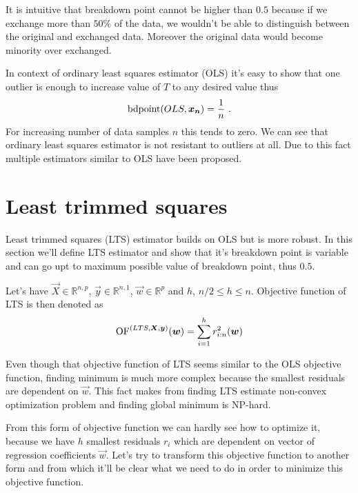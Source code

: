 It is intuitive that breakdown point cannot be higher than $0.5$ \cite{rouss:1986} because if we exchange more than $50\%$ of the data, we wouldn't be able to distinguish between the original and exchanged data. Moreover the original data would become minority over exchanged.


In context of ordinary least squares estimator (OLS) it's easy to show that one outlier is enough to increase value of $T$ to any desired value thus 
\begin{equation}
    \bdpoint(OLS,\vec{x_n} ) = \frac{1}{n}\ .
\end{equation}
For increasing number of data samples $n$ this tends to zero. We can see that ordinary least squares estimator is not resistant to outliers at all. Due to this fact multiple estimators similar to OLS have been proposed. 


\section{Least trimmed squares}
Least trimmed squares (LTS) estimator builds on OLS but is more robust. In this section we'll define LTS estimator and show that it's breakdown point is variable and can go upt to maximum possible value of breakdown point, thus $0.5$.


\begin{definition} Let's have $\vec{X} \in \mathbb{R}^{n,p}$, $\vec{y} \in \mathbb{R}^{n,1}$, 
    $\vec{w} \in \mathbb{R}^p$ and $h$, $ n/2 \leq h \leq n$. Objective function of LTS is then denoted as 
    \begin{equation} 
        \operatorname{OF}^{(LTS,\boldsymbol{X}, \boldsymbol{y})}(\boldsymbol{w}) =  \sum\limits_{i=1}^h r_{i:n}^2(\boldsymbol{w})  
    \end{equation}
\end{definition}

Even though that objective function of LTS seems similar to the OLS objective function, finding minimum is much more complex because the smallest residuals are dependent on $\vec{w}$. This fact makes from finding LTS estimate non-convex optimization problem and finding global minimum is NP-hard. 

From this form of objective function we can hardly see how to optimize it, because we have $h$ smallest residuals $r_i$ which are dependent on vector of regression coefficients $\vec{w}$. 
Let's try to transform this objective function to another form and from which it'll be clear what we need to do in order to minimize this objective function.

